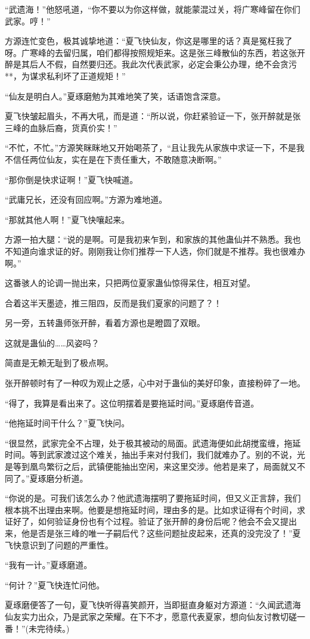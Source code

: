 \begin{this_body}
“武遗海！”他怒吼道，“你不要以为你这样做，就能蒙混过关，将广寒峰留在你们武家。哼！”

方源连忙变色，极其诚挚地道：“夏飞快仙友，你这是哪里的话？真是冤枉我了呀。广寒峰的去留归属，咱们都得按照规矩来。这是张三峰散仙的东西，若这张开醉是其后人不假，自然要归还。我此次代表武家，必定会秉公办理，绝不会贪污**，为谋求私利坏了正道规矩！”

“仙友是明白人。”夏琢磨勉为其难地笑了笑，话语饱含深意。

夏飞快皱起眉头，不再大吼，而是道：“所以说，你赶紧验证一下，张开醉就是张三峰的血脉后裔，货真价实！”

“不忙，不忙。”方源笑眯眯地又开始喝茶了，“且让我先从家族中求证一下，不是我不信任两位仙友，实在是在下责任重大，不敢随意决断啊。”

“那你倒是快求证啊！”夏飞快喊道。

“武庸兄长，还没有回应啊。”方源为难地道。

“那就其他人啊！”夏飞快嚷起来。

方源一拍大腿：“说的是啊。可是我初来乍到，和家族的其他蛊仙并不熟悉。我也不知道向谁求证的好。刚刚我让你们推荐一下人选，你们就是不推荐。我也很难办啊。”

这番骇人的论调一抛出来，只把两位夏家蛊仙惊得呆住，相互对望。

合着这半天墨迹，推三阻四，反而是我们夏家的问题了？！

另一旁，五转蛊师张开醉，看着方源也是瞪圆了双眼。

这就是蛊仙的……风姿吗？

简直是无赖无耻到了极点啊。

张开醉顿时有了一种叹为观止之感，心中对于蛊仙的美好印象，直接粉碎了一地。

“得了，我算是看出来了。这位明摆着是要拖延时间。”夏琢磨传音道。

“他拖延时间干什么？”夏飞快问。

“很显然，武家完全不占理，处于极其被动的局面。武遗海便如此胡搅蛮缠，拖延时间。等到武家渡过这个难关，抽出手来对付我们，我们就难办了。别的不说，光是等到凰鸟繁衍之后，武镇便能抽出空闲，来这里交涉。他若是来了，局面就又不同了。”夏琢磨分析道。

“你说的是。可我们该怎么办？他武遗海摆明了要拖延时间，但又义正言辞，我们根本挑不出理由来啊。他要是想拖延时间，理由多的是。比如求证得有个时间，求证好了，如何验证身份也有个过程。验证了张开醉的身份后呢？他会不会又提出来，他是否是张三峰的唯一子嗣后代？这些问题扯皮起来，还真的没完没了！”夏飞快意识到了问题的严重性。

“我有一计。”夏琢磨道。

“何计？”夏飞快连忙问他。

夏琢磨便答了一句，夏飞快听得喜笑颜开，当即挺直身躯对方源道：“久闻武遗海仙友实力出众，乃是武家之荣耀。在下不才，愿意代表夏家，想向仙友讨教切磋一番！”(未完待续。)

\end{this_body}

